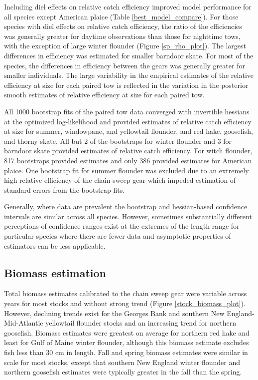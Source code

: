 \documentclass[
  12pt,
]{article}
\begin{document}
Including diel effects on relative catch efficiency improved model
performance for all species except American plaice (Table
\ref{best_model_compare}). For those species with diel effects on
relative catch efficiency, the ratio of the efficiencies was generally
greater for daytime observations than those for nighttime tows, with the
exception of large winter flounder (Figure \ref{sp_rho_plot}). The
largest differences in efficiency was estimated for smaller barndoor
skate. For most of the species, the differences in efficiency between
the gears was generally greater for smaller individuals. The large
variability in the empirical estimates of the relative efficiency at
size for each paired tow is reflected in the variation in the posterior
smooth estimates of relative efficiency at size for each paired tow.

All 1000 bootstrap fits of the paired tow data converged with invertible
hessians at the optimized log-likelihood and provided estimates of
relative catch efficiency at size for summer, windowpane, and yellowtail
flounder, and red hake, goosefish, and thorny skate. All but 2 of the
bootstraps for winter flounder and 3 for barndoor skate provided
estimates of relative catch efficiency. For witch flounder, 817
bootstraps provided estimates and only 386 provided estimates for
American plaice. One bootstrap fit for summer flounder was excluded due
to an extremely high relative efficiency of the chain sweep gear which
impeded estimation of standard errors from the bootstrap fits.

Generally, where data are prevalent the bootstrap and hessian-based
confidence intervals are similar across all species. However, sometimes
substantially different perceptions of confidence ranges exist at the
extremes of the length range for particular species where there are
fewer data and asymptotic properties of estimators can be less
applicable.

\hypertarget{biomass-estimation-1}{%
\subsection{Biomass estimation}\label{biomass-estimation-1}}

Total biomass estimates calibrated to the chain sweep gear were variable
across years for most stocks and without strong trend (Figure
\ref{stock_biomass_plot}). However, declining trends exist for the
Georges Bank and southern New England-Mid-Atlantic yellowtail flounder
stocks and an increasing trend for northern goosefish. Biomass estimates
were greatest on average for northern red hake and least for Gulf of
Maine winter flounder, although this biomass estimate excludes fish less
than 30 cm in length. Fall and spring biomass estimates were similar in
scale for most stocks, except that southern New England winter flounder
and northern goosefish estimates were typically greater in the fall than
the spring.
\end{document}
